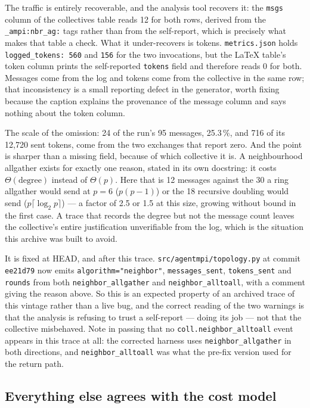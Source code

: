 \documentclass[11pt]{article}
\begin{document}
The traffic is entirely recoverable, and the analysis tool recovers it: the \texttt{msgs}
column of the collectives table reads 12 for both rows, derived from the
\texttt{\_ampi:nbr\_ag:} tags rather than from the self-report, which is precisely what makes
that table a check. What it under-recovers is tokens. \texttt{metrics.json} holds
\texttt{logged\_tokens: 560} and \texttt{156} for the two invocations, but the LaTeX table's
token column prints the self-reported \texttt{tokens} field and therefore reads 0 for both.
Messages come from the log and tokens come from the collective in the same row; that
inconsistency is a small reporting defect in the generator, worth fixing because the caption
explains the provenance of the message column and says nothing about the token column.

The scale of the omission: 24 of the run's 95 messages, 25.3\,\%, and 716 of its 12{,}720
sent tokens, come from the two exchanges that report zero. And the point is sharper than a
missing field, because of which collective it is. A neighbourhood allgather exists for exactly
one reason, stated in its own docstring: it costs $\Theta(\text{degree})$ instead of
$\Theta(p)$. Here that is 12 messages against the 30 a ring allgather would send at $p=6$
($p(p-1)$) or the 18 recursive doubling would send ($p\lceil \log_2 p \rceil$) --- a factor of
2.5 or 1.5 at this size, growing without bound in the first case. A trace that records the
degree but not the message count leaves the collective's entire justification unverifiable
from the log, which is the situation this archive was built to avoid.

It is fixed at HEAD, and after this trace. \texttt{src/agentmpi/topology.py} at commit
\texttt{ee21d79} now emits \texttt{algorithm="neighbor"}, \texttt{messages\_sent},
\texttt{tokens\_sent} and \texttt{rounds} from both \texttt{neighbor\_allgather} and
\texttt{neighbor\_alltoall}, with a comment giving the reason above. So this is an expected
property of an archived trace of this vintage rather than a live bug, and the correct reading
of the two warnings is that the analysis is refusing to trust a self-report --- doing its job
--- not that the collective misbehaved. Note in passing that no \texttt{coll.neighbor\_alltoall}
event appears in this trace at all: the corrected harness uses \texttt{neighbor\_allgather} in
both directions, and \texttt{neighbor\_alltoall} was what the pre-fix version used for the
return path.

\subsection*{Everything else agrees with the cost model}
\end{document}
